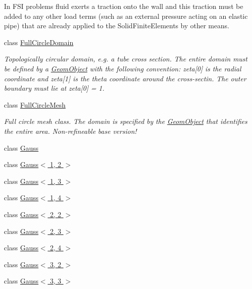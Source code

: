 \begin{DoxyCompactItemize}
\begin{DoxyCompactList}
\begin{DoxyEnumerate}
\item In F\+SI problems fluid exerts a traction onto the wall and this traction must be added to any other load terms (such as an external pressure acting on an elastic pipe) that are already applied to the Solid\+Finite\+Elements by other means.
\end{DoxyEnumerate}\end{DoxyCompactList}\item 
class \hyperlink{classoomph_1_1FullCircleDomain}{Full\+Circle\+Domain}
\begin{DoxyCompactList}\small\item\em Topologically circular domain, e.\+g. a tube cross section. The entire domain must be defined by a \hyperlink{classoomph_1_1GeomObject}{Geom\+Object} with the following convention\+: zeta\mbox{[}0\mbox{]} is the radial coordinate and zeta\mbox{[}1\mbox{]} is the theta coordinate around the cross-\/sectin. The outer boundary must lie at zeta\mbox{[}0\mbox{]} = 1. \end{DoxyCompactList}\item 
class \hyperlink{classoomph_1_1FullCircleMesh}{Full\+Circle\+Mesh}
\begin{DoxyCompactList}\small\item\em Full circle mesh class. The domain is specified by the \hyperlink{classoomph_1_1GeomObject}{Geom\+Object} that identifies the entire area. Non-\/refineable base version! \end{DoxyCompactList}\item 
class \hyperlink{classoomph_1_1Gauss}{Gauss}
\item 
class \hyperlink{classoomph_1_1Gauss_3_011_00_012_01_4}{Gauss$<$ 1, 2 $>$}
\item 
class \hyperlink{classoomph_1_1Gauss_3_011_00_013_01_4}{Gauss$<$ 1, 3 $>$}
\item 
class \hyperlink{classoomph_1_1Gauss_3_011_00_014_01_4}{Gauss$<$ 1, 4 $>$}
\item 
class \hyperlink{classoomph_1_1Gauss_3_012_00_012_01_4}{Gauss$<$ 2, 2 $>$}
\item 
class \hyperlink{classoomph_1_1Gauss_3_012_00_013_01_4}{Gauss$<$ 2, 3 $>$}
\item 
class \hyperlink{classoomph_1_1Gauss_3_012_00_014_01_4}{Gauss$<$ 2, 4 $>$}
\item 
class \hyperlink{classoomph_1_1Gauss_3_013_00_012_01_4}{Gauss$<$ 3, 2 $>$}
\item 
class \hyperlink{classoomph_1_1Gauss_3_013_00_013_01_4}{Gauss$<$ 3, 3 $>$}

\end{DoxyCompactItemize}

